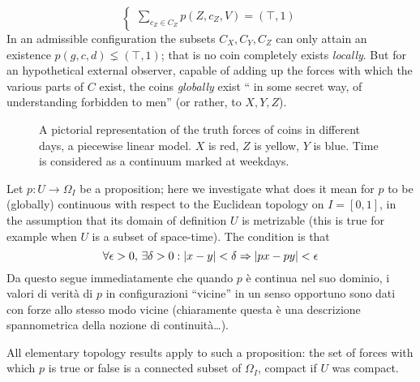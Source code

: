 \begin{example}
\[\begin{cases}
    \sum_{c_Z\in C_Z} p(Z,c_Z,V) = (\top,1)
  \end{cases}  
  \]
  In an admissible configuration the subsets $ C_X, C_Y, C_Z $ can only attain an existence $p(g,c,d) \lneq (\top,1)$; that is no coin completely exists \emph{locally}. But for an hypothetical external observer, capable of adding up the forces with which the various parts of $C$ exist, the coins \emph{globally} exist `` in some secret way, of understanding forbidden to men'' (or rather, to $ X, Y, Z $).
  \begin{center}
  \begin{figure}
      \caption{A pictorial representation of the truth forces of coins in different days, a piecewise linear model. $X$ is red, $Z$ is yellow, $Y$ is blue. Time is considered as a continuum marked at weekdays.}
  \end{figure}
\end{center}
\end{example}
\begin{remark}\label{continuiti}
  Let $p : U \to \Omega_I$ be a proposition; here we investigate what does it mean for $p$ to be (globally) continuous with respect to the Euclidean topology on $I=[0,1]$, in the assumption that its domain of definition $U$ is metrizable (this is true for example when $U$ is a subset of space-time). The condition is that 
  \[ \forall \epsilon > 0,\,\exists \delta > 0 : |x-y|< \delta \Rightarrow |px-py| < \epsilon \]
  Da questo segue immediatamente che quando $p$ è continua nel suo dominio, i valori di verità di $p$ in configurazioni ``vicine'' in un senso opportuno sono dati con forze allo stesso modo vicine (chiaramente questa è una descrizione spannometrica della nozione di continuità\dots).

  All elementary topology results apply to such a proposition: the set of forces with which $p$ is true or false is a connected subset of $\Omega_I$, compact if $U$ was compact.
\end{remark}
